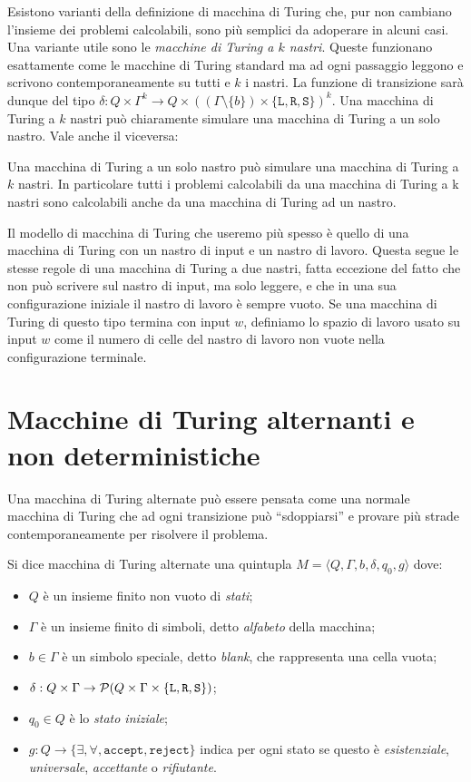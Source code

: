 Esistono varianti della definizione di macchina di Turing che, pur non cambiano
l'insieme dei problemi calcolabili, sono più semplici da adoperare in alcuni
casi. Una variante utile sono le
\emph{macchine di Turing a $k$ nastri}. Queste funzionano esattamente come le
macchine di Turing standard ma ad ogni passaggio leggono e scrivono contemporaneamente su
tutti e $k$ i nastri. La funzione di transizione sarà dunque del tipo
$\delta:  Q \times \Gamma^k \to Q \times ((\Gamma \setminus \{b\}) \times \{\texttt{L},\texttt{R},\texttt{S}\})^k$.
Una macchina di Turing a $k$ nastri può chiaramente simulare una macchina di Turing
a un solo nastro. Vale anche il viceversa:

\begin{fatto}
Una macchina di Turing a un solo nastro può simulare una macchina di Turing
a $k$ nastri.
In particolare tutti i problemi calcolabili da una macchina
di Turing a k nastri sono calcolabili anche da una macchina di Turing ad un nastro.
\end{fatto}

Il modello di macchina di Turing che useremo più spesso è quello di una macchina di Turing
con un nastro di input e un nastro di lavoro. Questa segue le stesse regole di
una macchina di Turing a due nastri, fatta eccezione del fatto che non può scrivere
sul nastro di input, ma solo leggere, e che in una sua configurazione iniziale
il nastro di lavoro è sempre vuoto. Se una macchina di Turing di questo tipo
termina con input $w$, definiamo lo spazio di lavoro usato su input $w$
come il numero di celle del nastro di lavoro non vuote nella configurazione terminale.


\section{Macchine di Turing alternanti e non deterministiche}
Una macchina di Turing alternate può essere pensata come una normale macchina di
Turing che ad ogni transizione può ``sdoppiarsi'' e provare più strade contemporaneamente
per risolvere il problema.

\begin{definizione}
\label{def:alt-TM}
 Si dice macchina di Turing alternate una quintupla
 $M=\langle Q, \Gamma, b, \delta, q_0, g \rangle$ dove:
 \begin{itemize}
  \item $Q$ è un insieme finito non vuoto di \emph{stati};
  \item $\Gamma$ è un insieme finito di simboli, detto \emph{alfabeto} della macchina;
  \item $b \in \Gamma$ è un simbolo speciale, detto \emph{blank}, che rappresenta
  una cella vuota;
  \item $\delta: Q \times \Gamma \to \mathcal{P}(Q \times \Gamma \times \{\texttt{L},\texttt{R},\texttt{S}\})$;
  \item $q_0 \in Q$ è lo \emph{stato iniziale};
  \item $g: Q \to \{\exists, \forall, \texttt{accept}, \texttt{reject}\}$
  indica per ogni stato se questo è \emph{esistenziale}, \emph{universale},
  \emph{accettante} o \emph{rifiutante}.
 \end{itemize}
\end{definizione}

